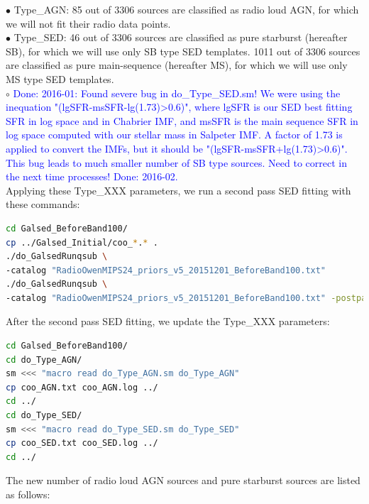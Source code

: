 \documentclass[11pt,a4paper]{article}
\begin{document}
\indent\hspace{15pt}$\bullet$ 
Type\_AGN: 85 out of 3306 sources are classified as radio loud AGN, for which we will not fit their radio data points. 
\\
\indent\hspace{15pt}$\bullet$ 
Type\_SED: 46 out of 3306 sources are classified as pure starburst (hereafter SB), for which we will use only SB type SED templates. 1011 out of 3306 sources are classified as pure main-sequence (hereafter MS), for which we will use only MS type SED templates. 
\\
\indent\hspace{15pt}$\circ$ 
\textcolor{blue}{Done: 2016-01: Found severe bug in do\_Type\_SED.sm! We were using the inequation "(lgSFR-msSFR-lg(1.73)>0.6)", where lgSFR is our SED best fitting SFR in log space and in Chabrier IMF, and msSFR is the main sequence SFR in log space computed with our stellar mass in Salpeter IMF. A factor of 1.73 is applied to convert the IMFs, but it should be "(lgSFR-msSFR+lg(1.73)>0.6)". This bug leads to much smaller number of SB type sources. Need to correct in the next time processes! Done: 2016-02.}
\\

Applying these Type\_XXX parameters, we run a second pass SED fitting with these commands:

\begin{lstlisting}[language=bash]
cd Galsed_BeforeBand100/
cp ../Galsed_Initial/coo_*.* .
./do_GalsedRunqsub \
-catalog "RadioOwenMIPS24_priors_v5_20151201_BeforeBand100.txt"
./do_GalsedRunqsub \
-catalog "RadioOwenMIPS24_priors_v5_20151201_BeforeBand100.txt" -postparallel
\end{lstlisting}

After the second pass SED fitting, we update the Type\_XXX parameters: 

\begin{lstlisting}[language=bash]
cd Galsed_BeforeBand100/
cd do_Type_AGN/
sm <<< "macro read do_Type_AGN.sm do_Type_AGN"
cp coo_AGN.txt coo_AGN.log ../
cd ../
cd do_Type_SED/
sm <<< "macro read do_Type_SED.sm do_Type_SED"
cp coo_SED.txt coo_SED.log ../
cd ../
\end{lstlisting}

The new number of radio loud AGN sources and pure starburst sources are listed as follows:
\end{document}
